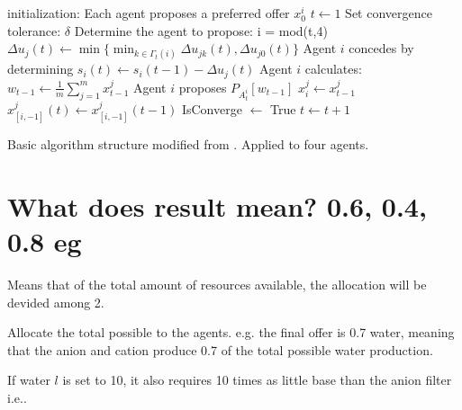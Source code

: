 \begin{algorithm}[h]
	initialization: Each agent proposes a preferred offer $x^i_0$\;
	$t\leftarrow1$\;
	Set convergence tolerance: $\delta$\;
	{
		Determine the agent to propose: i = mod(t,4)\;
		{
			{
				{
					$\Delta u_j(t)\leftarrow \min \{\min_{k\in\Gamma_t(i)}\Delta u_{jk}(t), \Delta u_{j0}(t)\}$ \;	
				}
				Agent $i$ concedes by determining $s_i(t)\leftarrow s_i(t-1)-\Delta u_j(t)$\;
				Agent $i$ calculates: $w_{t-1}\leftarrow \frac{1}{m}\sum_{j=1}^{m}x^j_{t-1}$\;
				Agent $i$ proposes $P_{A^i_t}[w_{t-1}]$\;
			}{
				$x^j_i \leftarrow x^j_{t-1}$\;
				$x^j_{[i,-1]}(t) \leftarrow x^j_{[i,-1]}(t-1)$\;
			}
		}
		{
			IsConverge $\leftarrow $ True\;
		}{
			$t \leftarrow t+1$\;
		}
	}
\caption{Basic algorithm structure modified from \citep{zheng2015automated}. Applied to four agents.}
\label{al:algorithm1}
\end{algorithm}
\clearpage
\section{What does result mean? 0.6, 0.4, 0.8 eg}
\label{sec:design:mean}
Means that of the total amount of resources available, the allocation will be devided among 2. 

Allocate the total possible to the agents. e.g. the final offer is 0.7 water, meaning that the anion and cation produce 0.7 of the total possible water production. 

If water $l$ is set to 10, it also requires 10 times as little base than the anion filter i.e..

